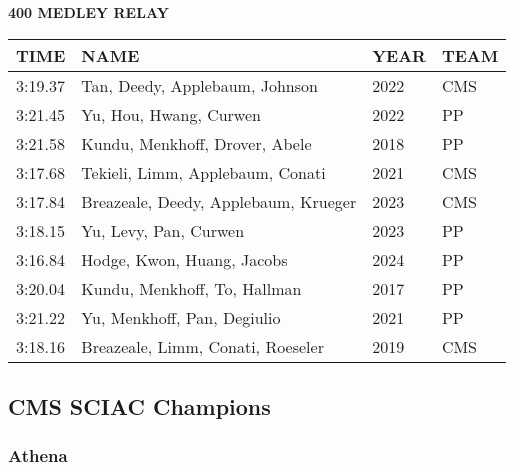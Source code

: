 \begin{table}[H]
\centering
\begin{minipage}[t]{0.6\textwidth}
\centering
\textbf{400 MEDLEY RELAY}\\[0.1cm]
\begin{tabular}{@{}p{1.8cm}p{2.8cm}p{1.2cm}p{1.4cm}@{}}
\hline
    \textbf{TIME} & \textbf{NAME} & \textbf{YEAR} & \textbf{TEAM} \\
\hline
    3:19.37 & Tan, Deedy, Applebaum, Johnson & 2022 & CMS \\
    3:21.45 & Yu, Hou, Hwang, Curwen & 2022 & PP \\
    3:21.58 & Kundu, Menkhoff, Drover, Abele & 2018 & PP \\
    3:17.68 & Tekieli, Limm, Applebaum, Conati & 2021 & CMS \\
    3:17.84 & Breazeale, Deedy, Applebaum, Krueger & 2023 & CMS \\
    3:18.15 & Yu, Levy, Pan, Curwen & 2023 & PP \\
    3:16.84 & Hodge, Kwon, Huang, Jacobs & 2024 & PP \\
    3:20.04 & Kundu, Menkhoff, To, Hallman & 2017 & PP \\
    3:21.22 & Yu, Menkhoff, Pan, Degiulio & 2021 & PP \\
    3:18.16 & Breazeale, Limm, Conati, Roeseler & 2019 & CMS \\
\hline
\end{tabular}
\end{minipage}
\end{table}


\newpage

\subsection{CMS SCIAC Champions}
\subsubsection{Athena}

